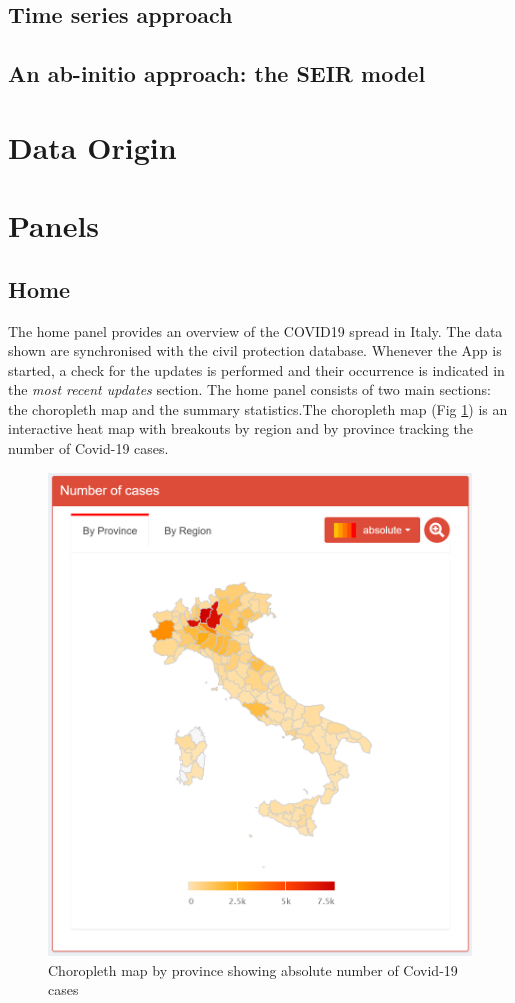 \documentclass[
12pt, %
a4paper, %
oneside, %
headinclude,footinclude, %
BCOR5mm, %
]{scrartcl}
\begin{document}
\subsection{Time series approach}

\subsection{An ab-initio approach: the SEIR model}


\section{Data Origin} \label{Data Origin}




\clearpage

\section{Panels} \label{Panels}

\subsection{Home}

The home panel provides an overview of the COVID19 spread in Italy. The data shown are synchronised with the civil protection database. Whenever the App is started,  a check for the updates is performed and their occurrence is indicated in the \textit{ most recent updates }section. The home panel consists of two main sections: the choropleth map and the summary statistics.The choropleth map (Fig \ref{Home_fig1}) is an interactive heat map with breakouts by region and by province tracking the number of Covid-19 cases. 

\begin{figure}[h]
 \centering
 \includegraphics[width=0.5\linewidth]{Figures/Home_figure_1.png} 
 \caption{Choropleth map by province showing absolute number of Covid-19 cases}
 \label{Home_fig1}
\end{figure}
\end{document}
